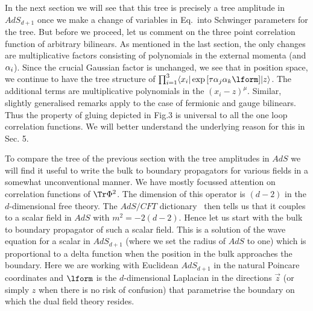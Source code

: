In the next section we will see that this tree is precisely a tree amplitude in $AdS_{d+1}$
once we make a change of variables in Eq.\posglue\ into Schwinger parameters for the tree. 
But before we proceed, let us comment on the three point correlation 
function of arbitrary bilinears. 
As mentioned in the last section, the only changes are multiplicative factors 
consisting of polynomials in the external
momenta (and ${\alpha}_i$). Since the crucial Gaussian factor is unchanged, we see that 
in position space, we continue to have the tree structure of 
$\prod_{i=1}^3\la x_i|\exp{[\t\a_j\a_k\lform]}|z\ra$. The additional terms are 
multiplicative polynomials in the $(x_i-z)^{\mu}$. Similar, slightly generalised remarks apply 
to the case of fermionic and gauge bilinears. 
Thus the property of gluing depicted in Fig.3  
is universal to all the one loop correlation functions. We will better understand the 
underlying reason  for this in Sec. 5.



To compare the tree of the previous section with the tree amplitudes in $AdS$ we 
will find it useful to write the bulk to boundary propagators for various fields in 
a somewhat unconventional manner. We have mostly focussed attention on correlation functions
of $\Tr\Phi^2$.
The dimension of this operator is $(d-2)$ in the $d$-dimensional free theory. 
The $AdS/CFT$ dictionary \gkp\witads\ then tells us that it couples to a scalar field in $AdS$ with 
$m^2=-2(d-2)$. 
Hence
let us start with the bulk to boundary propagator of such a scalar field. 
This is a solution of the 
wave equation for a scalar in $AdS_{d+1}$ (where we set the radius of $AdS$ to one) 
\eqn{}
which is proportional to a delta function when the 
position in the bulk approaches the boundary. Here we are working with Euclidean $AdS_{d+1}$
in the natural Poincare coordinates
\eqn{}
and $\lform$ is the $d$-dimensional Laplacian in the directions $\vec{z}$ 
(or simply $z$ when there is no risk of confusion) that parametrise the 
boundary on which the dual field theory resides.

